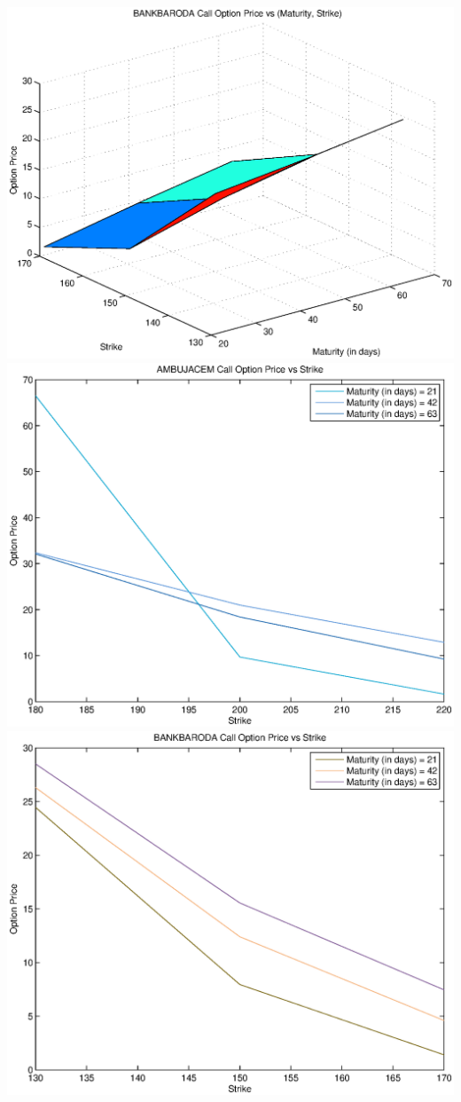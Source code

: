 \documentclass{article}
\begin{document}
\includegraphics[width=\textwidth]{BANKBARODA_Call_Option_Price_vs_(Maturity,_Strike)} \\
\includegraphics[width=\textwidth]{AMBUJACEM_Call_Option_Price_vs_Strike} \\               
\includegraphics[width=\textwidth]{BANKBARODA_Call_Option_Price_vs_Strike} \\
\end{document}
